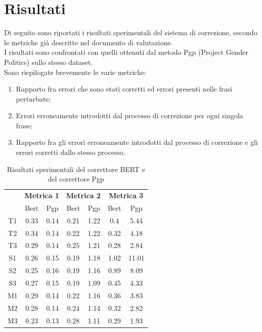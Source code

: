 \documentclass[12pt]{article}
\begin{document}
\section{Risultati}

Di seguito sono riportati i risultati sperimentali del sistema di correzione, secondo le metriche già descritte nel documento di valutazione.\\
I risultati sono confrontati con quelli ottenuti dal metodo Pgp (Project Gender Politics) sullo stesso dataset.\\
Sono riepilogate brevemente le varie metriche:
\begin{enumerate}
\item Rapporto fra errori che sono stati corretti ed errori presenti nelle frasi perturbate;
\item Errori erroneamente introdotti dal processo di correzione per ogni singola frase;
\item Rapporto fra gli errori erroneamente introdotti dal processo di correzione e gli errori corretti dallo stesso processo.
\end{enumerate}

\begin{table}[H]
\centering
\begin{tabular}{c|cc|cc|cc}
& \multicolumn{2}{c}{\textbf{Metrica 1}} & \multicolumn{2}{c}{\textbf{Metrica 2}} & \multicolumn{2}{c}{\textbf{Metrica 3}} \\
& Bert & Pgp & Bert & Pgp & Bert & Pgp \\ \hline
T1 & 0.33 & 0.14 & 0.21 & 1.22 & 0.4 & 5.44 \\
T2 & 0.34 & 0.14 & 0.22 & 1.22 & 0.32 & 4.18 \\
T3 & 0.29 & 0.14 & 0.25 & 1.21 & 0.28 & 2.84 \\
S1 & 0.26 & 0.15 & 0.19 & 1.18 & 1.02 & 11.01 \\
S2 & 0.25 & 0.16 & 0.19 & 1.16 & 0.89 & 8.09 \\
S3 & 0.27 & 0.15 & 0.19 & 1.09 & 0.45 & 4.33 \\
M1 & 0.29 & 0.14 & 0.22 & 1.16 & 0.36 & 3.83 \\
M2 & 0.28 & 0.14 & 0.24 & 1.14 & 0.32 & 2.82 \\
M3 & 0.23 & 0.13 & 0.28 & 1.11 & 0.29 & 1.93 \\
\end{tabular}
\caption{Risultati sperimentali del correttore BERT e del correttore Pgp}
\end{table}
\end{document}
